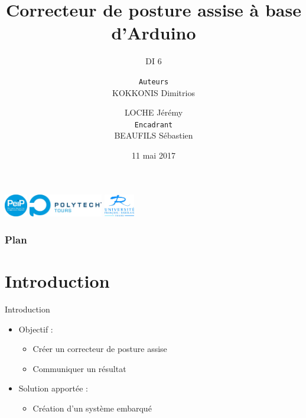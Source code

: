 \documentclass{beamer}
\title{Correcteur de posture assise à base d'Arduino}
\subtitle{\small DI 6}
\author[KOKKONIS Dimitrios \\\and LOCHE Jérémy]{\small {\small \texttt{Auteurs}}\\ KOKKONIS Dimitrios \\\and LOCHE Jérémy\\
\vspace{5px}
{\small \texttt{Encadrant}}\\ BEAUFILS Sébastien}
\institute{\textsc{École Polytechnique de l'Université de Tours}}
\date{11 mai 2017}
\begin{document}
\begin{frame}
\vspace{0.1cm}
\includegraphics[height=1cm]{images/Logo_PeiP_v2009_RGB_3cm_300dpi.jpg}
\includegraphics[height=1cm]{images/logo_Polytech_Tours_RVB_3cm_300dpi.jpg}
\hfill
\includegraphics[height=1cm]{images/logo_UFR_4cm_300dpi.jpg}
\titlepage
\end{frame}

\begin{frame}
\frametitle{Plan}
\tableofcontents
\end{frame}

\section*{Introduction}
\begin{frame}
\begin{block}{Introduction}
\begin{itemize}
\pause
\item Objectif :
\pause
\begin{itemize}
\item Créer un correcteur de posture assise
\pause
\item Communiquer un résultat
\end{itemize}
\pause
\item Solution apportée :
\begin{itemize}
\pause
\item Création d'un système embarqué 
\end{itemize}
\end{itemize}
\end{block}
\end{frame}
\end{document}
